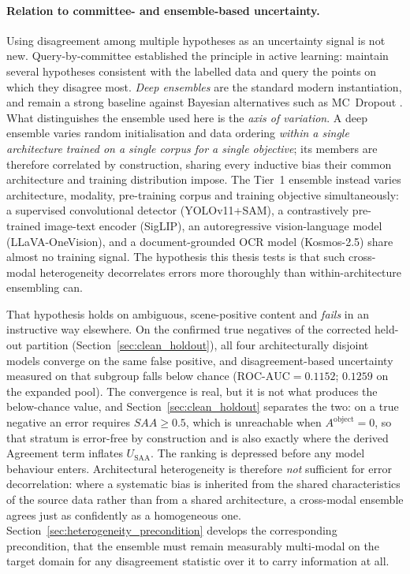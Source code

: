 \documentclass[12pt,a4paper]{report}
\begin{document}
\paragraph{Relation to committee- and ensemble-based uncertainty.} Using disagreement among multiple hypotheses as an uncertainty signal is not new. Query-by-committee \cite{seung1992qbc} established the principle in active learning: maintain several hypotheses consistent with the labelled data and query the points on which they disagree most. \textit{Deep ensembles} \cite{deepensembles2017} are the standard modern instantiation, and remain a strong baseline against Bayesian alternatives such as MC~Dropout \cite{gal2016dropout}. What distinguishes the ensemble used here is the \emph{axis of variation}. A deep ensemble varies random initialisation and data ordering \emph{within a single architecture trained on a single corpus for a single objective}; its members are therefore correlated by construction, sharing every inductive bias their common architecture and training distribution impose. The Tier~1 ensemble instead varies architecture, modality, pre-training corpus and training objective simultaneously: a supervised convolutional detector (YOLOv11+SAM), a contrastively pre-trained image-text encoder (SigLIP), an autoregressive vision-language model (LLaVA-OneVision), and a document-grounded OCR model (Kosmos-2.5) share almost no training signal. The hypothesis this thesis tests is that such cross-modal heterogeneity decorrelates errors more thoroughly than within-architecture ensembling can.

That hypothesis holds on ambiguous, scene-positive content and \emph{fails} in an instructive way elsewhere. On the confirmed true negatives of the corrected held-out partition (Section~\ref{sec:clean_holdout}), all four architecturally disjoint models converge on the same false positive, and disagreement-based uncertainty measured on that subgroup falls below chance ($\text{ROC-AUC}=0.1152$; $0.1259$ on the expanded pool). The convergence is real, but it is not what produces the below-chance value, and Section~\ref{sec:clean_holdout} separates the two: on a true negative an error requires $SAA \ge 0.5$, which is unreachable when $A^{\text{object}}=0$, so that stratum is error-free by construction and is also exactly where the derived Agreement term inflates $U_{\text{SAA}}$. The ranking is depressed before any model behaviour enters. Architectural heterogeneity is therefore \emph{not} sufficient for error decorrelation: where a systematic bias is inherited from the shared characteristics of the source data rather than from a shared architecture, a cross-modal ensemble agrees just as confidently as a homogeneous one. Section~\ref{sec:heterogeneity_precondition} develops the corresponding precondition, that the ensemble must remain measurably multi-modal on the target domain for any disagreement statistic over it to carry information at all.
\end{document}
